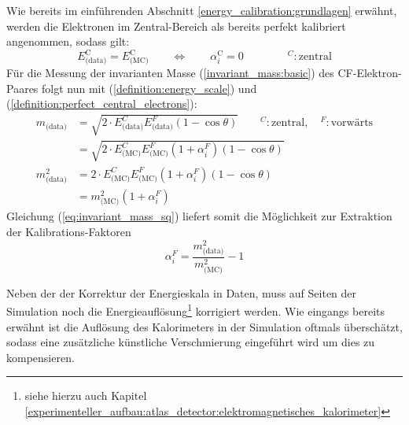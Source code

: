 Wie bereits im einführenden Abschnitt \ref{energy_calibration:grundlagen}
erwähnt, werden die Elektronen im Zentral-Bereich als bereits perfekt
kalibriert angenommen, sodass gilt:
\begin{equation}
    \label{definition:perfect_central_electrons}
    E_\text{(data)}^\text{C} = E_\text{(MC)}^\text{C}
    \qquad \Longleftrightarrow \qquad
    \alpha_i^\text{C} = 0
    \qquad\qquad
    ^C : \text{zentral}
\end{equation}
Für die Messung der invarianten Masse (\ref{invariant_mass:basic}) des
\acs{CF}-Elektron-Paares folgt nun mit (\ref{definition:energy_scale}) und
(\ref{definition:perfect_central_electrons}):
\begin{align}
    m_\text{(data)}   &= \sqrt{ 2 \cdot E^C_\text{(data)} E^F_{\text{(data)}}
                         (1-\cos\theta)} 
                         \qquad ^C: \text{zentral}, \quad ^F: \text{vorwärts}
                         \nonumber \\[5pt]
                      &= \sqrt{ 2 \cdot E^C_\text{(MC)} E^F_{\text{(MC)}}
                         (1+\alpha^F_i)(1-\cos\theta)}
                         \nonumber \\[15pt]
    m^2_\text{(data)} &= 2 \cdot E^C_\text{(MC)} E^F_{\text{(MC)}}
                         (1+\alpha^F_i)(1-\cos\theta)
                         \nonumber \\[5pt]
                      &= m^2_\text{(MC)} (1+\alpha^F_i)
                         \label{eq:invariant_mass_sq}
\end{align}
Gleichung (\ref{eq:invariant_mass_sq}) liefert somit die Möglichkeit zur
Extraktion der Kalibrations-Faktoren
\begin{equation}
    \label{eq:extraction_alpha}
    \alpha_i^F = \frac{m^2_\text{(data)}}{m^2_\text{(MC)}} - 1
\end{equation}

Neben der der Korrektur der Energieskala in Daten, muss auf Seiten der
Simulation noch die Energieauflösung\footnote{siehe hierzu auch Kapitel
\ref{experimenteller_aufbau:atlas_detector:elektromagnetisches_kalorimeter}}
korrigiert werden. Wie eingangs bereits erwähnt ist die Auflösung des
Kalorimeters in der Simulation oftmals überschätzt, sodass eine zusätzliche
künstliche Verschmierung eingeführt wird um dies zu kompensieren.

